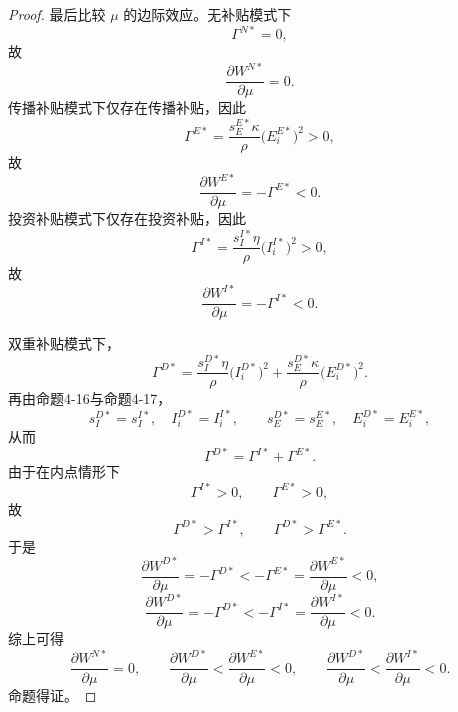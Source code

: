 \begin{proof}
最后比较 \(\mu\) 的边际效应。无补贴模式下
\[
\Gamma^{N*}=0,
\]
故
\[
\frac{\partial W^{N*}}{\partial \mu}=0.
\]
传播补贴模式下仅存在传播补贴，因此
\[
\Gamma^{E*}
=
\frac{s_E^{E*}\kappa}{\rho}\bigl(E_i^{E*}\bigr)^2>0,
\]
故
\[
\frac{\partial W^{E*}}{\partial \mu}=-\Gamma^{E*}<0.
\]
投资补贴模式下仅存在投资补贴，因此
\[
\Gamma^{I*}
=
\frac{s_I^{I*}\eta}{\rho}\bigl(I_i^{I*}\bigr)^2>0,
\]
故
\[
\frac{\partial W^{I*}}{\partial \mu}=-\Gamma^{I*}<0.
\]

双重补贴模式下，
\[
\Gamma^{D*}
=
\frac{s_I^{D*}\eta}{\rho}\bigl(I_i^{D*}\bigr)^2
+
\frac{s_E^{D*}\kappa}{\rho}\bigl(E_i^{D*}\bigr)^2.
\]
再由命题4-16与命题4-17，
\[
s_I^{D*}=s_I^{I*},\quad I_i^{D*}=I_i^{I*},
\qquad
s_E^{D*}=s_E^{E*},\quad E_i^{D*}=E_i^{E*},
\]
从而
\[
\Gamma^{D*}=\Gamma^{I*}+\Gamma^{E*}.
\]
由于在内点情形下
\[
\Gamma^{I*}>0,\qquad \Gamma^{E*}>0,
\]
故
\[
\Gamma^{D*}>\Gamma^{I*},\qquad \Gamma^{D*}>\Gamma^{E*}.
\]
于是
\[
\frac{\partial W^{D*}}{\partial \mu}
=
-\Gamma^{D*}
<
-\Gamma^{E*}
=
\frac{\partial W^{E*}}{\partial \mu}<0,
\]
\[
\frac{\partial W^{D*}}{\partial \mu}
=
-\Gamma^{D*}
<
-\Gamma^{I*}
=
\frac{\partial W^{I*}}{\partial \mu}<0.
\]
综上可得
\[
\frac{\partial W^{N*}}{\partial \mu}=0,\qquad
\frac{\partial W^{D*}}{\partial \mu}
<
\frac{\partial W^{E*}}{\partial \mu}<0,\qquad
\frac{\partial W^{D*}}{\partial \mu}
<
\frac{\partial W^{I*}}{\partial \mu}<0.
\]
命题得证。
\end{proof}

